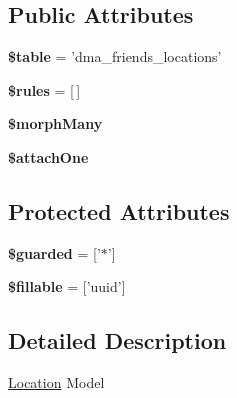 \subsection*{Public Attributes}
\begin{DoxyCompactItemize}
\item 
\hypertarget{classDMA_1_1Friends_1_1Models_1_1Location_ac1f41b316e50581d95f80655e36b7f9d}{{\bfseries \$table} = 'dma\+\_\+friends\+\_\+locations'}\label{classDMA_1_1Friends_1_1Models_1_1Location_ac1f41b316e50581d95f80655e36b7f9d}

\item 
\hypertarget{classDMA_1_1Friends_1_1Models_1_1Location_a3df0019a82eb74c240408878329baa2c}{{\bfseries \$rules} = \mbox{[}$\,$\mbox{]}}\label{classDMA_1_1Friends_1_1Models_1_1Location_a3df0019a82eb74c240408878329baa2c}

\item 
{\bfseries \$morph\+Many}
\item 
{\bfseries \$attach\+One}
\end{DoxyCompactItemize}
\subsection*{Protected Attributes}
\begin{DoxyCompactItemize}
\item 
\hypertarget{classDMA_1_1Friends_1_1Models_1_1Location_a248021f938f61b3ccce7e20b259e39e9}{{\bfseries \$guarded} = \mbox{[}'$\ast$'\mbox{]}}\label{classDMA_1_1Friends_1_1Models_1_1Location_a248021f938f61b3ccce7e20b259e39e9}

\item 
\hypertarget{classDMA_1_1Friends_1_1Models_1_1Location_aaa75ba74c2a24c4e42b109b0b2c82ca0}{{\bfseries \$fillable} = \mbox{[}'uuid'\mbox{]}}\label{classDMA_1_1Friends_1_1Models_1_1Location_aaa75ba74c2a24c4e42b109b0b2c82ca0}

\end{DoxyCompactItemize}


\subsection{Detailed Description}
\hyperlink{classDMA_1_1Friends_1_1Models_1_1Location}{Location} Model 

